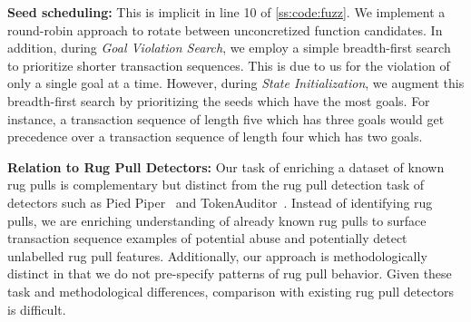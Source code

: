 \smallskip
\noindent
\textbf{Seed scheduling:}
This is implicit in line 10 of \autoref{ss:code:fuzz}.
We implement a round-robin approach to rotate between unconcretized function candidates.
In addition, during \textit{Goal Violation Search}, we employ a simple breadth-first search to prioritize shorter transaction sequences.
This is due to us  for the violation of only a single goal at a time.
However, during \textit{State Initialization}, we augment this breadth-first search by prioritizing the seeds which have  the most goals.
For instance, a transaction sequence of length five which has  three goals would get precedence over a transaction sequence of length four which has  two goals.


\smallskip
\noindent
\textbf{Relation to Rug Pull Detectors:}
Our task of enriching a dataset of known rug pulls is complementary but distinct from the rug pull detection task of detectors such as Pied Piper~\cite{pied-piper} and TokenAuditor~\cite{tokenauditor_qrs22}.
Instead of identifying rug pulls, we are enriching understanding of already known rug pulls to surface transaction sequence examples of potential abuse and potentially detect unlabelled rug pull features.
Additionally, our approach is methodologically distinct in that we do not pre-specify patterns of rug pull behavior.
Given these task and methodological differences, comparison with existing rug pull detectors is difficult.

